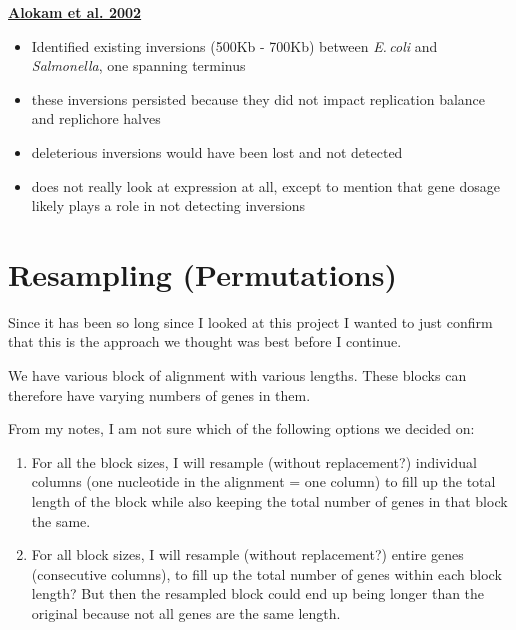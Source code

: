 \documentclass[12pt]{article}
\newcommand{\sal}{\textit{Salmonella}\xspace}
\newcommand{\ecol}{\textit{E.\,coli}\xspace}
\begin{document}
\textbf{\href{https://jb.asm.org/content/184/22/6190}{Alokam et al. 2002}}
\begin{itemize}
	\item Identified existing inversions (500Kb - 700Kb) between \ecol and \sal, one spanning terminus
	\item these inversions persisted because they did not impact replication balance and replichore halves
	\item deleterious inversions would have been lost and not detected
	\item does not really look at expression at all, except to mention that gene dosage likely plays a role in not detecting inversions
\end{itemize}


\section{Resampling (Permutations)}
Since it has been so long since I looked at this project I wanted to just confirm that this is the approach we thought was best before I continue.

We have various block of alignment with various lengths. These blocks can therefore have varying numbers of genes in them.

From my notes, I am not sure which of the following options we decided on:
\begin{enumerate}
	\item For all the block sizes, I will resample (without replacement?) individual columns (one nucleotide in the alignment = one column) to fill up the total length of the block while also keeping the total number of genes in that block the same.
	\item For all block sizes, I will resample (without replacement?) entire genes (consecutive columns), to fill up the total number of genes within each block length? But then the resampled block could end up being longer than the original because not all genes are the same length. 
\end{enumerate}
\end{document}
